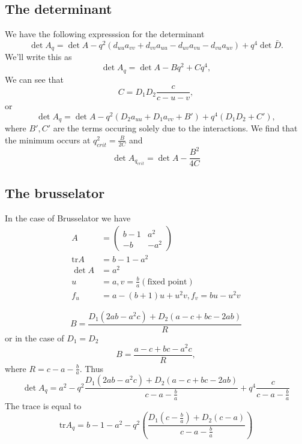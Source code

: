 \documentclass{article}
\newcommand{\tr}{\text{tr}}
\begin{document}
\subsection{The determinant}
We have the following expresssion for the determinant
\begin{equation}
\det A_q = \det A - q^2(d_{uu}a_{vv}+d_{vv}a_{uu}-d_{uv}a_{vu}-d_{vu}a_{uv})+q^4 \det \bar{D}.
\end{equation}
We'll write this as
\begin{equation}
\det A_q = \det A - Bq^2 + C q^4,
\end{equation}
We can see that
\begin{equation}
C = D_1D_2\frac{c}{c-u-v},
\end{equation}
or
\begin{equation}
\det A_q = \det A - q^2(D_{2}a_{uu}+D_1a_{vv} + B') + q^4 (D_1 D_2 + C'),
\end{equation}
where $B',C'$ are the terms occuring solely due to the interactions.
We find that the minimum occurs at $q_{crit}^2 = \frac {B}{2C}$ and
\begin{equation}
\det A_{q_{crit}} = \det A - \frac{B^2}{4C}
\end{equation}


\subsection{The brusselator}
In the case of Brusselator we have
\begin{align}
A&=\begin{pmatrix}b-1& a^2 \\ -b &-a^2\end{pmatrix}\\
\tr A &= b-1-a^2\\
\det A&= a^2\\
u&=a,v=\frac{b}{a} (\text{fixed point})\\
f_u &= a-(b+1)u+u^2v, f_v = bu-u^2v
\end{align}

\begin{equation}
B=\frac{D_1(2ab-a^2c)+D_2(a-c+bc-2ab)}{R}
\end{equation} or in the case of $D_1 = D_2$
\begin{equation}
B = \frac{a-c+bc-a^2c}{R},
\end{equation}
where $R = c-a-\frac ba$.
Thus
\begin{equation}
\det A_q = a^2 - q^2\frac{D_1(2ab-a^2c)+D_2(a-c+bc-2ab)}{c-a-\frac{b}{a}}+q^4\frac{c}{c-a-\frac{b}{a}}
\end{equation}
The trace is equal to
\begin{equation}
\tr A_q = b-1-a^2 - q^2 (\frac{D_1(c-\frac{b}{a})+D_2(c-a)}{c-a-\frac{b}{a}})
\end{equation}
\end{document}
